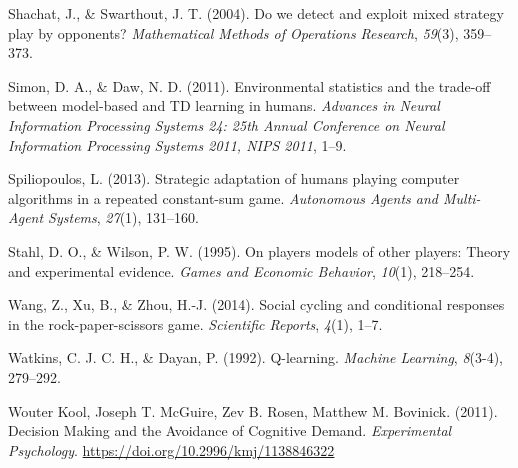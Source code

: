 \documentclass[man,floatsintext]{apa6}
\begin{document}
\leavevmode\hypertarget{ref-shachat2004we}{}%
Shachat, J., \& Swarthout, J. T. (2004). Do we detect and exploit mixed strategy play by opponents? \emph{Mathematical Methods of Operations Research}, \emph{59}(3), 359--373.

\leavevmode\hypertarget{ref-Simon_Daw_11}{}%
Simon, D. A., \& Daw, N. D. (2011). Environmental statistics and the trade-off between model-based and TD learning in humans. \emph{Advances in Neural Information Processing Systems 24: 25th Annual Conference on Neural Information Processing Systems 2011, NIPS 2011}, 1--9.

\leavevmode\hypertarget{ref-spiliopoulos2013strategic}{}%
Spiliopoulos, L. (2013). Strategic adaptation of humans playing computer algorithms in a repeated constant-sum game. \emph{Autonomous Agents and Multi-Agent Systems}, \emph{27}(1), 131--160.

\leavevmode\hypertarget{ref-stahl1995players}{}%
Stahl, D. O., \& Wilson, P. W. (1995). On players models of other players: Theory and experimental evidence. \emph{Games and Economic Behavior}, \emph{10}(1), 218--254.

\leavevmode\hypertarget{ref-wang2014social}{}%
Wang, Z., Xu, B., \& Zhou, H.-J. (2014). Social cycling and conditional responses in the rock-paper-scissors game. \emph{Scientific Reports}, \emph{4}(1), 1--7.

\leavevmode\hypertarget{ref-watkins1992q}{}%
Watkins, C. J. C. H., \& Dayan, P. (1992). Q-learning. \emph{Machine Learning}, \emph{8}(3-4), 279--292.

\leavevmode\hypertarget{ref-Kool_2011}{}%
Wouter Kool, Joseph T. McGuire, Zev B. Rosen, Matthew M. Bovinick. (2011). Decision Making and the Avoidance of Cognitive Demand. \emph{Experimental Psychology}. \url{https://doi.org/10.2996/kmj/1138846322}

\endgroup
\end{document}
